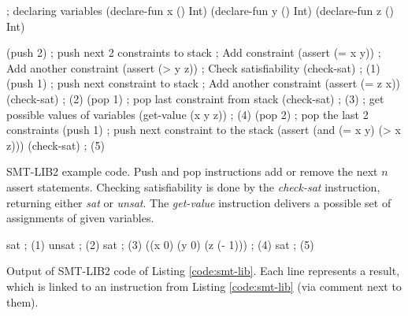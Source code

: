 \begin{program}[h!]
	\begin{LispCode}
; declaring variables
(declare-fun x () Int)
(declare-fun y () Int)
(declare-fun z () Int)
		
(push 2) ; push next 2 constraints to stack
; Add constraint
(assert (= x y))
; Add another constraint
(assert (> y z))
; Check satisfiability
(check-sat) ; (1)
(push 1) ; push next constraint to stack
; Add another constraint
(assert (= z x))
(check-sat) ; (2)
(pop 1) ; pop last constraint from stack
(check-sat) ; (3)
; get possible values of variables
(get-value (x y z)) ; (4)
(pop 2) ; pop the last 2 constraints
(push 1) ; push next constraint to the stack
(assert (and (= x y) (> x z)))
(check-sat) ; (5)\end{LispCode}
	\caption{SMT-LIB2 example code. Push and pop instructions add or remove the next $n$ assert statements. Checking satisfiability is done by the \emph{check-sat} instruction, returning either \emph{sat} or \emph{unsat}. The \emph{get-value} instruction delivers a possible set of assignments of given variables. }
	\label{code:smt-lib}
\end{program}

\begin{program}[h!]
	\begin{GenericCode}
sat ; (1)
unsat ; (2)
sat ; (3)
((x 0) (y 0) (z (- 1))) ; (4)
sat ; (5)
\end{GenericCode}
	\caption{Output of SMT-LIB2 code of Listing \ref{code:smt-lib}. Each line represents a result, which is linked to an instruction from Listing \ref{code:smt-lib} (via comment next to them).}
	\label{code:smt-lib out}
\end{program}



